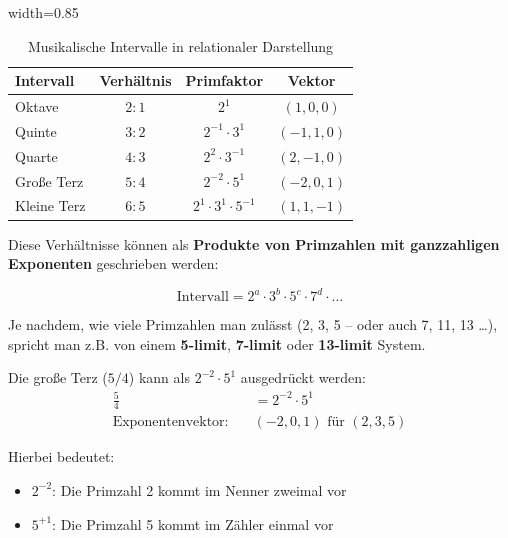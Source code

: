 	\begin{table}[htbp]
		\centering
		\begin{adjustbox}{width=0.85\textwidth}
			\begin{tabular}{lccc}
				\toprule
				\textbf{Intervall} & \textbf{Verhältnis} & \textbf{Primfaktor} & \textbf{Vektor} \\
				\midrule
				Oktave & $2:1$ & $2^1$ & $(1, 0, 0)$ \\
				Quinte & $3:2$ & $2^{-1} \cdot 3^1$ & $(-1, 1, 0)$ \\
				Quarte & $4:3$ & $2^2 \cdot 3^{-1}$ & $(2, -1, 0)$ \\
				Große Terz & $5:4$ & $2^{-2} \cdot 5^1$ & $(-2, 0, 1)$ \\
				Kleine Terz & $6:5$ & $2^1 \cdot 3^1 \cdot 5^{-1}$ & $(1, 1, -1)$ \\
				\bottomrule
			\end{tabular}
		\end{adjustbox}
		\caption{Musikalische Intervalle in relationaler Darstellung}
		\label{tab:intervalle}
	\end{table}
	
	Diese Verhältnisse können als \textbf{Produkte von Primzahlen mit ganzzahligen Exponenten} geschrieben werden:
	
	\begin{equation}
		\text{Intervall} = 2^a \cdot 3^b \cdot 5^c \cdot 7^d \cdot \ldots
	\end{equation}
	
	Je nachdem, wie viele Primzahlen man zulässt (2, 3, 5 – oder auch 7, 11, 13 \ldots), spricht man z.B. von einem \textbf{5-limit}, \textbf{7-limit} oder \textbf{13-limit} System.
	
	\begin{example}
		Die große Terz ($5/4$) kann als $2^{-2} \cdot 5^1$ ausgedrückt werden:
		\begin{align}
			\frac{5}{4} &= 2^{-2} \cdot 5^1 \\
			\text{Exponentenvektor:} \quad &(-2, 0, 1) \text{ für } (2, 3, 5)
		\end{align}
		
		Hierbei bedeutet:
		\begin{itemize}
			\item $2^{-2}$: Die Primzahl 2 kommt im Nenner zweimal vor
			\item $5^{+1}$: Die Primzahl 5 kommt im Zähler einmal vor
		\end{itemize}
	\end{example}
	
